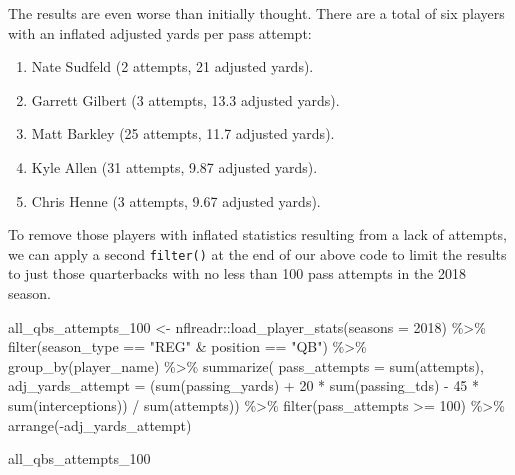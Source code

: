 \documentclass[
  letterpaper,
]{krantz}
\newenvironment{Shaded}{\begin{snugshade}}{\end{snugshade}}
\newcommand{\AttributeTok}[1]{\textcolor[rgb]{0.40,0.45,0.13}{#1}}
\newcommand{\DecValTok}[1]{\textcolor[rgb]{0.68,0.00,0.00}{#1}}
\newcommand{\FunctionTok}[1]{\textcolor[rgb]{0.28,0.35,0.67}{#1}}
\newcommand{\NormalTok}[1]{\textcolor[rgb]{0.00,0.23,0.31}{#1}}
\newcommand{\OtherTok}[1]{\textcolor[rgb]{0.00,0.23,0.31}{#1}}
\newcommand{\SpecialCharTok}[1]{\textcolor[rgb]{0.37,0.37,0.37}{#1}}
\newcommand{\StringTok}[1]{\textcolor[rgb]{0.13,0.47,0.30}{#1}}
\providecommand{\tightlist}{%
  \setlength{\itemsep}{0pt}\setlength{\parskip}{0pt}}\usepackage{longtable,booktabs,array}
\begin{document}
\begin{tcolorbox}
The results are even worse than initially thought. There are a total of
six players with an inflated adjusted yards per pass attempt:

\begin{enumerate}
\def\labelenumi{\arabic{enumi}.}
\tightlist
\item
  Nate Sudfeld (2 attempts, 21 adjusted yards).
\item
  Garrett Gilbert (3 attempts, 13.3 adjusted yards).
\item
  Matt Barkley (25 attempts, 11.7 adjusted yards).
\item
  Kyle Allen (31 attempts, 9.87 adjusted yards).
\item
  Chris Henne (3 attempts, 9.67 adjusted yards).
\end{enumerate}

To remove those players with inflated statistics resulting from a lack
of attempts, we can apply a second \texttt{filter()} at the end of our
above code to limit the results to just those quarterbacks with no less
than 100 pass attempts in the 2018 season.

\begin{Shaded}
\begin{Highlighting}[]
\NormalTok{all\_qbs\_attempts\_100 }\OtherTok{\textless{}{-}}
\NormalTok{  nflreadr}\SpecialCharTok{::}\FunctionTok{load\_player\_stats}\NormalTok{(}\AttributeTok{seasons =} \DecValTok{2018}\NormalTok{) }\SpecialCharTok{\%\textgreater{}\%}
  \FunctionTok{filter}\NormalTok{(season\_type }\SpecialCharTok{==} \StringTok{"REG"} \SpecialCharTok{\&}\NormalTok{ position }\SpecialCharTok{==} \StringTok{"QB"}\NormalTok{) }\SpecialCharTok{\%\textgreater{}\%}
  \FunctionTok{group\_by}\NormalTok{(player\_name) }\SpecialCharTok{\%\textgreater{}\%}
  \FunctionTok{summarize}\NormalTok{(}
    \AttributeTok{pass\_attempts =} \FunctionTok{sum}\NormalTok{(attempts),}
    \AttributeTok{adj\_yards\_attempt =}\NormalTok{ (}\FunctionTok{sum}\NormalTok{(passing\_yards) }\SpecialCharTok{+} \DecValTok{20} \SpecialCharTok{*}
                           \FunctionTok{sum}\NormalTok{(passing\_tds) }\SpecialCharTok{{-}} \DecValTok{45} \SpecialCharTok{*}
                           \FunctionTok{sum}\NormalTok{(interceptions)) }\SpecialCharTok{/} \FunctionTok{sum}\NormalTok{(attempts)) }\SpecialCharTok{\%\textgreater{}\%}
  \FunctionTok{filter}\NormalTok{(pass\_attempts }\SpecialCharTok{\textgreater{}=} \DecValTok{100}\NormalTok{) }\SpecialCharTok{\%\textgreater{}\%}
  \FunctionTok{arrange}\NormalTok{(}\SpecialCharTok{{-}}\NormalTok{adj\_yards\_attempt)}

\NormalTok{all\_qbs\_attempts\_100}
\end{Highlighting}
\end{Shaded}

\end{tcolorbox}
\end{document}
